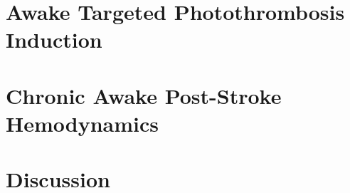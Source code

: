 \section{Awake Targeted Photothrombosis Induction}

\blindtext



\section{Chronic Awake Post-Stroke Hemodynamics}

\blindtext



\section{Discussion}

\blindtext




